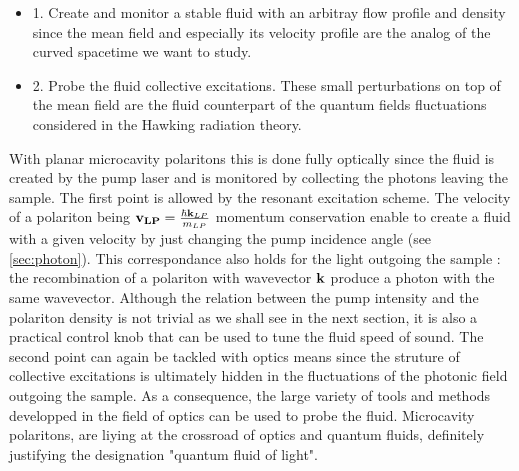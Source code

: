 \begin{itemize}
    \item 1. Create and monitor a stable fluid with an arbitray flow profile and density since the mean field and especially its velocity profile are the analog of the curved spacetime we want to study.
    \item 2. Probe the fluid collective excitations. These small perturbations on top of the mean field are the fluid counterpart of the quantum fields fluctuations considered in the Hawking radiation theory.
\end{itemize}

With planar microcavity polaritons this is done fully optically since the fluid is created by the pump laser and is monitored by collecting the photons leaving the sample. 
The first point is allowed by the resonant excitation scheme. The velocity of a polariton being $\mathbf{v_{LP}}=\frac{\hbar \mathbf{k}_{LP}}{m_{LP}}$ momentum conservation enable to create a fluid with a given velocity by just changing the pump incidence angle (see \autoref{sec:photon}).
This correspondance also holds for the light outgoing the sample : the recombination of a polariton with wavevector $\mathbf{k}$ produce a photon with the same wavevector. 
Although the relation between the pump intensity and the polariton density is not trivial as we shall see in the next section, it is also a practical control knob that can be used to tune the fluid speed of sound.
The second point can again be tackled with optics means since the struture of collective excitations is ultimately hidden in the fluctuations of the photonic field outgoing the sample. As a consequence, the large
variety of tools and methods developped in the field of optics can be used to probe the fluid. Microcavity polaritons, are liying at the crossroad of optics and quantum fluids, definitely justifying the designation "quantum fluid of light".
